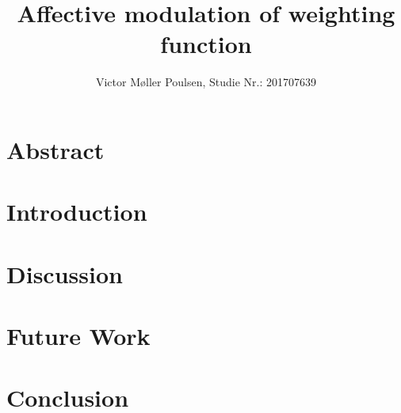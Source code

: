 \documentclass[12pt]{article}
\title{Affective modulation of weighting function}
\author{Victor Møller Poulsen, Studie Nr.: 201707639}
\begin{document}
\maketitle
\leavevmode

\section{Abstract}

\section{Introduction}

\section{Discussion}

\section{Future Work}

\section{Conclusion}

\printbibliography
\end{document}
